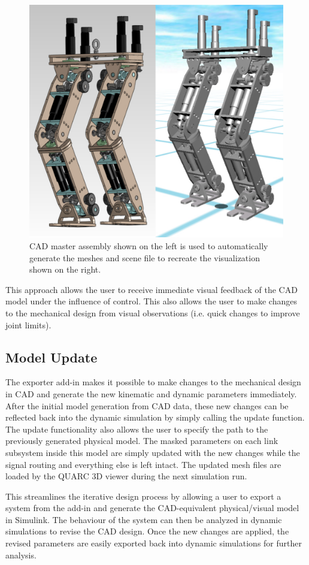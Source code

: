 \begin{figure}[!b]
	\centering
    \includegraphics[scale=0.50]{fig/ch3/masterscene.pdf}
  	\caption{CAD master assembly shown on the left is used to automatically generate the meshes and scene file to recreate the visualization shown on the right.}
	\label{fig:masterscene}
\end{figure}

This approach allows the user to receive immediate visual feedback of the CAD model under the influence of control. This also allows the user to make changes to the mechanical design from visual observations (i.e. quick changes to improve joint limits).

\subsection{Model Update} %
\label{sub:model_update}
The exporter add-in makes it possible to make changes to the mechanical design in CAD and generate the new kinematic and dynamic parameters immediately. After the initial model generation from CAD data, these new changes can be reflected back into the dynamic simulation by simply calling the update function. The update functionality also allows the user to specify the path to the previously generated physical model. The masked parameters on each link subsystem inside this model are simply updated with the new changes while the signal routing and everything else is left intact. The updated mesh files are loaded by the QUARC 3D viewer during the next simulation run.

This streamlines the iterative design process by allowing a user to export a system from the add-in and generate the CAD-equivalent physical/visual model in Simulink. The behaviour of the system can then be analyzed in dynamic simulations to revise the CAD design. Once the new changes are applied, the revised parameters are easily exported back into dynamic simulations for further analysis.


